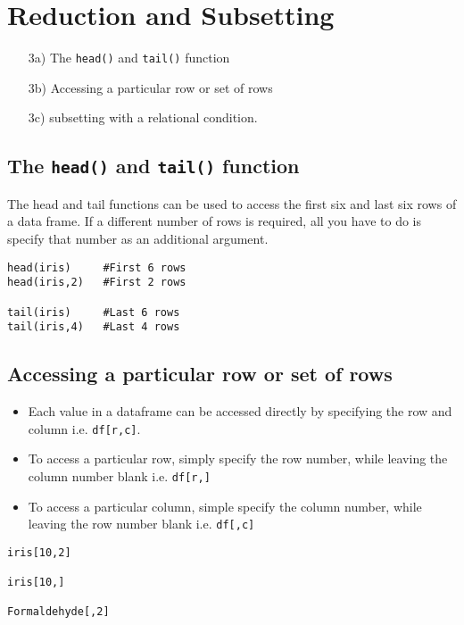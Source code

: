 \documentclass[a4paper,12pt]{article}
\begin{document}
\section{Reduction and Subsetting}
\begin{itemize}
\item[3a)] The \texttt{head()} and \texttt{tail()} function
\item[3b)] Accessing a particular row or set of rows
\item[3c)] subsetting with a relational condition.
\end{itemize}

\subsection{The \texttt{head()} and \texttt{tail()} function}
The head and tail functions can be used to access the first six and last six rows of a data frame. If a different number of rows is required, all you have to do is specify that number as an additional argument.
\begin{framed}
\begin{verbatim}
head(iris)     #First 6 rows
head(iris,2)   #First 2 rows

tail(iris)     #Last 6 rows
tail(iris,4)   #Last 4 rows
\end{verbatim}
\end{framed}

\subsection{Accessing a particular row or set of rows}

\begin{itemize}
\item Each value in a dataframe can be accessed directly by specifying the row and column i.e. \texttt{df[r,c]}.
\item To access a particular row, simply specify the row number, while leaving the column number blank i.e. \texttt{df[r,]}
\item To access a particular column, simple specify the column number, while leaving the row number blank i.e. \texttt{df[,c]}
\end{itemize}

\begin{framed}
\begin{verbatim}
iris[10,2]

iris[10,] 

Formaldehyde[,2]  
\end{verbatim}
\end{framed}
\end{document}
